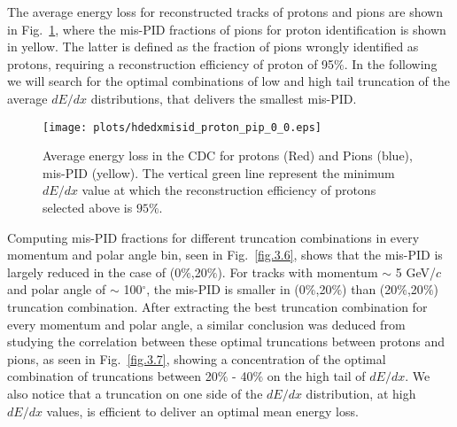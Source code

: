 The average energy loss for reconstructed tracks of protons and pions are shown in Fig.~\ref{fig.3.5}, where the mis-PID fractions of pions for proton identification is shown in yellow. The latter is defined as the fraction of pions wrongly identified as protons, requiring a reconstruction efficiency of proton of 95$\%$. In the following we will search for the optimal combinations of low and high tail truncation of the average $dE/dx$ distributions, that delivers the smallest mis-PID.

\begin{figure}[H]
    \centering
    \texttt{[image: plots/hdedxmisid\_proton\_pip\_0\_0.eps]}
    \caption{\label{fig.3.5}Average energy loss in the CDC for protons (Red) and Pions (blue), mis-PID (yellow). The vertical green line represent the minimum $dE/dx$ value at which the reconstruction efficiency of protons selected above is $95\%$.}
\end{figure}

Computing mis-PID fractions for different truncation combinations in every momentum and polar angle bin, seen in Fig.~\ref{fig.3.6}, shows that the mis-PID is largely reduced in the case of (0$\%$,20$\%$). For tracks with momentum $\sim$ 5 GeV/$c$ and polar angle of $\sim$ 100$^{\circ}$, the mis-PID is smaller in (0$\%$,20$\%$) than (20$\%$,20$\%$) truncation combination. After extracting the best truncation combination for every momentum and polar angle, a similar conclusion was deduced from studying the correlation between these optimal truncations between protons and pions, as seen in Fig.~\ref{fig.3.7}, showing a concentration of the optimal combination of truncations between 20$\%$ - 40$\%$ on the high tail of $dE/dx$. We also notice that a truncation on one side of the $dE/dx$ distribution, at high $dE/dx$ values, is efficient to deliver an optimal mean energy loss.


